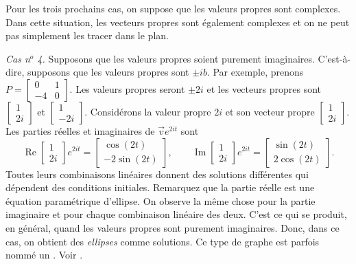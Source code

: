 \medskip

\pagebreak[0]
Pour les trois prochains cas, on suppose que les valeurs propres sont complexes. Dans cette situation, les vecteurs propres sont également complexes et on ne peut pas simplement les tracer dans le plan.

\medskip

\pagebreak[0]
\emph{Cas n$^o$ 4.} Supposons que les valeurs propres soient purement imaginaires. C’est-à-dire, supposons que les valeurs propres sont $\pm ib$. Par exemple, prenons $P = 
\left[ \begin{smallmatrix} 0 & 1 \\ -4 & 0 \end{smallmatrix} \right]$.
Les valeurs propres seront $\pm 2i$ et les vecteurs propres sont
$\left[ \begin{smallmatrix} 1 \\ 2i \end{smallmatrix} \right]$ et
$\left[ \begin{smallmatrix} 1 \\ -2i \end{smallmatrix} \right]$.  Considérons la valeur propre $2i$ et son vecteur propre
$\left[ \begin{smallmatrix} 1 \\ 2i \end{smallmatrix} \right]$.
Les parties réelles et imaginaires de $\vec{v} e^{2it}$ sont
\begin{equation*}
\operatorname{Re}
\begin{bmatrix} 1 \\ 2i \end{bmatrix} e^{2it} =
\begin{bmatrix} \cos (2t) \\ -2 \sin (2t)  \end{bmatrix} ,
\qquad
\operatorname{Im}
\begin{bmatrix} 1 \\ 2i \end{bmatrix} e^{2it} =
\begin{bmatrix} \sin (2t) \\ 2 \cos (2t) \end{bmatrix} .
\end{equation*}
Toutes leurs combinaisons linéaires donnent des solutions différentes qui dépendent des conditions initiales. Remarquez que la partie réelle est une équation paramétrique d’ellipse. On observe la même chose pour la partie imaginaire et pour chaque combinaison linéaire des deux. C’est ce qui se produit, en général, quand les valeurs propres sont purement imaginaires. Donc, dans ce cas, on obtient des \emph{ellipses} comme solutions. Ce type de graphe est parfois nommé un \emph{}. Voir .

